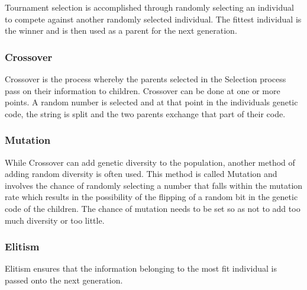 \documentclass[11pt, a4paper]{article}
\numberwithin{figure}{section}
\numberwithin{table}{section}
\begin{document}
Tournament selection is accomplished through randomly selecting an individual
to compete against another randomly selected individual. The fittest individual
is the winner and is then used as a parent for the next generation.

\subsubsection{Crossover}

Crossover is the process whereby the parents selected in the Selection process
pass on their information to children. Crossover can be done at one or more 
points. A random number is selected and at that point in the individuals genetic
code, the string is split and the two parents exchange that part of their code.

\subsubsection{Mutation}
While Crossover can add genetic diversity to the population, another method of
adding random diversity is often used. This method is called Mutation and 
involves the chance of randomly selecting a number that falls within the 
mutation rate which results in the possibility of the flipping of a random 
bit in the genetic code of the children. The chance 
of mutation needs to be set so as not to add too much diversity or too
little.

\subsubsection{Elitism}
Elitism ensures that the information belonging to the most fit individual is passed onto 
the next generation.
\end{document}
